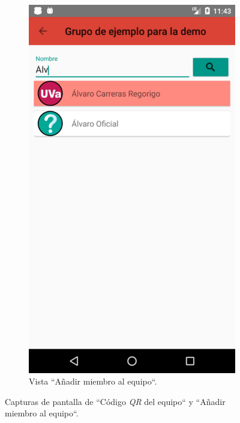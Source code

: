 \documentclass[twoside]{report}
\begin{document}
\begin{figure}[H]
\begin{center}
\begin{subfigure}[t]{.3\linewidth}
		\includegraphics[scale=0.2]{images/userguide/20.png}
		\caption{Vista “Añadir miembro al equipo“.}
	\end{subfigure}\hspace{5mm}%
\caption{Capturas de pantalla de “Código \textit{QR} del equipo“ y “Añadir miembro al equipo“.}
\end{center}
\end{figure}
\end{document}
